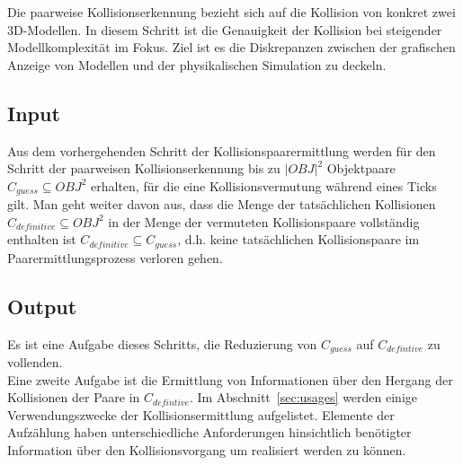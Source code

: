 \label{sec:l2}
Die paarweise Kollisionserkennung bezieht sich auf die Kollision von konkret zwei 3D-Modellen. In diesem Schritt ist die Genauigkeit der Kollision bei steigender Modellkomplexität im Fokus.
Ziel ist es die Diskrepanzen zwischen der grafischen Anzeige von Modellen und der physikalischen Simulation zu deckeln.
\subsection{Input}
Aus dem vorhergehenden Schritt der Kollisionspaarermittlung werden für den Schritt der paarweisen Kollisionserkennung bis zu  $|OBJ|^2$ Objektpaare $C_{guess}\subseteq OBJ^2$ erhalten, für die eine Kollisionsvermutung während eines Ticks gilt. Man geht weiter davon aus, dass die Menge der tatsächlichen Kollisionen $C_{definitive}\subseteq OBJ^2$ in der Menge der vermuteten Kollisionspaare  vollständig enthalten ist $C_{definitive}\subseteq C_{guess}$, d.h. keine tatsächlichen Kollisionspaare im Paarermittlungsprozess verloren gehen. 

\subsection{Output}
Es ist eine Aufgabe dieses Schritts, die Reduzierung von $C_{guess}$ auf $C_{defintive}$ zu vollenden.\\
Eine zweite Aufgabe ist die Ermittlung von Informationen über den Hergang der Kollisionen der Paare in $C_{defintive}$.
Im Abschnitt~\ref{sec:usages} werden einige Verwendungszwecke der Kollisionsermittlung aufgelistet. 
Elemente der Aufzählung haben unterschiedliche Anforderungen hinsichtlich benötigter Information über den Kollisionsvorgang um realisiert werden zu können.

